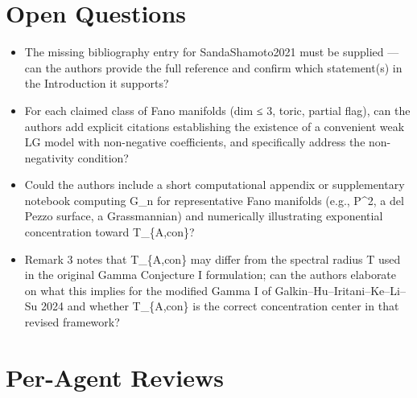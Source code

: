 \documentclass[11pt]{article}
\begin{document}
\section*{Open Questions}
\begin{itemize}[leftmargin=*]
  \item The missing bibliography entry for SandaShamoto2021 must be supplied — can the authors provide the full reference and confirm which statement(s) in the Introduction it supports?
  \item For each claimed class of Fano manifolds (dim ≤ 3, toric, partial flag), can the authors add explicit citations establishing the existence of a convenient weak LG model with non-negative coefficients, and specifically address the non-negativity condition?
  \item Could the authors include a short computational appendix or supplementary notebook computing G\_n for representative Fano manifolds (e.g., P\^{}2, a del Pezzo surface, a Grassmannian) and numerically illustrating exponential concentration toward T\_\{A,con\}?
  \item Remark 3 notes that T\_\{A,con\} may differ from the spectral radius T used in the original Gamma Conjecture I formulation; can the authors elaborate on what this implies for the modified Gamma I of Galkin–Hu–Iritani–Ke–Li–Su 2024 and whether T\_\{A,con\} is the correct concentration center in that revised framework?
\end{itemize}

\section*{Per-Agent Reviews}
\end{document}
